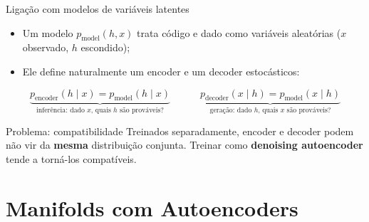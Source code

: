 \documentclass[aspectratio=169,xcolor=dvipsnames]{beamer}
\begin{document}
\begin{frame}{Ligação com modelos de variáveis latentes}
    \begin{itemize}
        \item Um modelo $p_{\text{model}}(h, x)$ trata código e dado como variáveis aleatórias ($x$ observado, $h$ escondido);
        \item Ele define naturalmente um encoder e um decoder estocásticos:
    \end{itemize}
    \[
        \underbrace{p_{\text{encoder}}(h \mid x) = p_{\text{model}}(h \mid x)}_{\text{inferência: dado } x\text{, quais } h \text{ são prováveis?}}
        \qquad\quad
        \underbrace{p_{\text{decoder}}(x \mid h) = p_{\text{model}}(x \mid h)}_{\text{geração: dado } h\text{, quais } x \text{ são prováveis?}}
    \]
    \vspace{0.2cm}
    \begin{alertblock}{Problema: compatibilidade}
        Treinados separadamente, encoder e decoder podem não vir da \textbf{mesma} distribuição conjunta. Treinar como \textbf{denoising autoencoder} tende a torná-los compatíveis.
    \end{alertblock}
\end{frame}



\section{Manifolds com Autoencoders}
\end{document}
